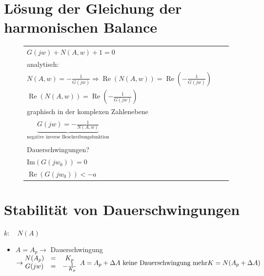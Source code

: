 \documentclass[ngerman]{tudscrreprt}
\begin{document}
\section{Lösung der Gleichung der harmonischen Balance}
\begin{figure}[htbp]
\begin{minipage}[c]{9.0cm}
\def\svgwidth{250pt} 
 
\end{minipage}
\begin{minipage}[c]{7cm}

\begin{tabular}{lll}
$G(jw) + N(A,w) +1 = 0$&&\\
analytisch:&&\\
$N(A,w) = -\frac{1}{G(jw)} \Rightarrow \operatorname{Re}(N(A,w)) = \operatorname{Re}(-\frac{1}{G(jw)})$ &&\\
$\operatorname{Re}(N(A,w)) = \operatorname{Re}(-\frac{1}{G(jw)})$&&\\
graphisch in der komplexen Zahlenebene &&\\
$\underbrace{G(jw) = -\frac{1}{N(A,w)}}_{\text{negative inverse Beschreibungsfunktion}}$&&\\
&&\\
Dauerschwingungen? &&\\
$\mathrm{Im}(G(jw_0)) = 0 $ &&\\
$\operatorname{Re}(G(jw_0)) < -a$ \\
\end{tabular}
\end{minipage}
\end{figure} 
\section{Stabilität von Dauerschwingungen}
\begin{figure}[H] 
  \centering 
  \def\svgwidth{120pt} 
   
\end{figure} 
$k: \quad N(A)$
\begin{itemize}
\item $A= A_p \rightarrow$ Dauerschwingung $\rightarrow \begin{matrix} N(A_p)& = & K_p \\G(jw) & =& -\frac{1}{K_p} \end{matrix}\\
A = A_p + \Delta A \text{  keine Dauerschwingung mehr}\\
K = N(A_p + \Delta A)$ 
\begin{figure}[H] 
  \centering 
  \def\svgwidth{350pt} 
   
\end{figure} 
\end{itemize}
\end{document}
